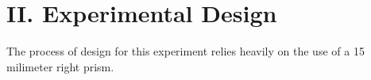 \section*{\textbf{II. Experimental Design}}

The process of design for this experiment relies heavily on the use of a 15 milimeter right prism. 